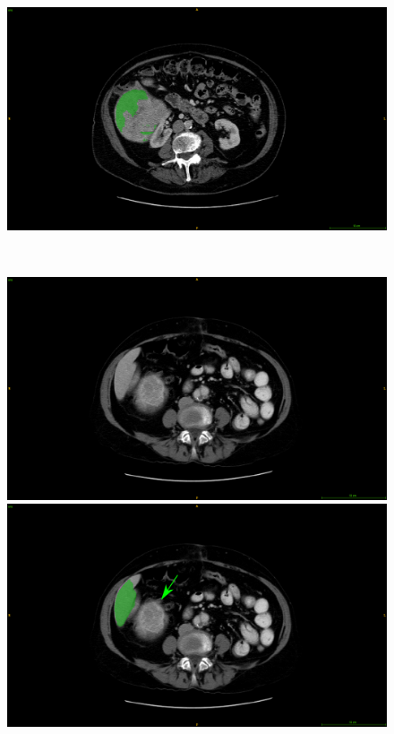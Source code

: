 \begin{figure}[ht!]
\begin{mdframed}[backgroundcolor=blue!50,linecolor=blue!50]
\begin{minipage}{0.45\linewidth}
		\end{minipage} \hspace{-0.1cm}
		\begin{minipage}{0.45\linewidth}
			\includegraphics[width=\linewidth]{images/MisSegmentations/TCGA-DD-A4NK_slice32_liverPrediction_Cmap}
		\end{minipage} \\
		\begin{minipage}{0.45\linewidth}
			\includegraphics[width=\linewidth]{images/MisSegmentations/TCGA-DD-A1EB_slice9_raw}
		\end{minipage} \hspace{-0.1cm}
		\begin{minipage}{0.45\linewidth}
			\includegraphics[width=\linewidth]{images/MisSegmentations/TCGA-DD-A1EB_slice9_liverPrediction_Cmap_Arrow}

\end{minipage}
\end{mdframed}
\end{figure}
